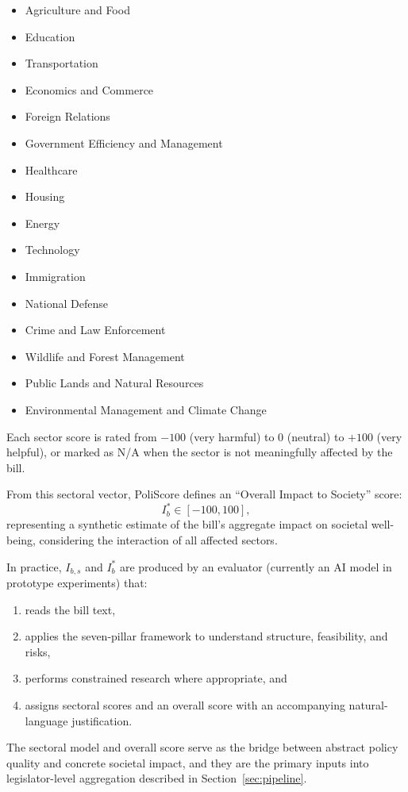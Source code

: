 \documentclass[12pt]{article}
\begin{document}
\begin{itemize}
    \item Agriculture and Food
    \item Education
    \item Transportation
    \item Economics and Commerce
    \item Foreign Relations
    \item Government Efficiency and Management
    \item Healthcare
    \item Housing
    \item Energy
    \item Technology
    \item Immigration
    \item National Defense
    \item Crime and Law Enforcement
    \item Wildlife and Forest Management
    \item Public Lands and Natural Resources
    \item Environmental Management and Climate Change
\end{itemize}

Each sector score is rated from \(-100\) (very harmful) to \(0\) (neutral) to \(+100\) (very helpful), or marked as N/A
when the sector is not meaningfully affected by the bill.

From this sectoral vector, PoliScore defines an ``Overall Impact to Society'' score:
\[
I_b^{\ast} \in [-100, 100],
\]
representing a synthetic estimate of the bill's aggregate impact on societal well-being, considering the interaction of
all affected sectors.

In practice, \(I_{b,s}\) and \(I_b^{\ast}\) are produced by an evaluator (currently an AI model in prototype experiments)
that:

\begin{enumerate}
    \item reads the bill text,
    \item applies the seven-pillar framework to understand structure, feasibility, and risks,
    \item performs constrained research where appropriate, and
    \item assigns sectoral scores and an overall score with an accompanying natural-language justification.
\end{enumerate}

The sectoral model and overall score serve as the bridge between abstract policy quality and concrete societal impact,
and they are the primary inputs into legislator-level aggregation described in Section~\ref{sec:pipeline}.
\end{document}
